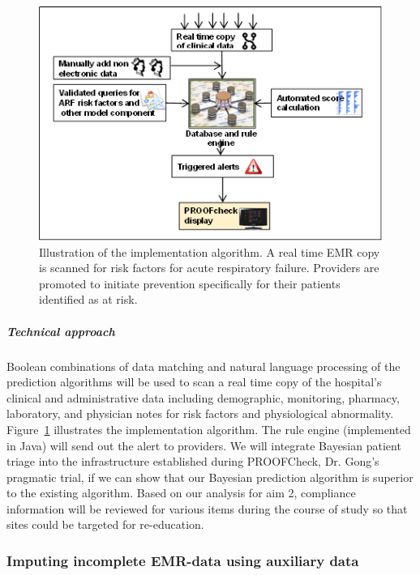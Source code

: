 \documentclass[11pt,notitlepage]{article}
\begin{document}
\begin{figure} 
 \vspace{-10pt}
 \includegraphics[scale=0.55]{Figures/Alert_trigger_fig.png} 
  \caption{\footnotesize Illustration of the implementation algorithm. A real time EMR copy is scanned for risk factors for acute respiratory failure. Providers are promoted to initiate prevention specifically for their patients identified as at risk.}
   \vspace{-20pt}
  \label{fig:implementation}
\end{figure} 

\subparagraph*{Technical approach}
Boolean combinations of data matching and natural language processing of the prediction algorithms will be used to scan a real time copy of the hospital's clinical and administrative data including demographic, monitoring, pharmacy, laboratory, and physician notes for risk factors and physiological abnormality. Figure~\ref{fig:implementation} illustrates the implementation algorithm. The rule engine (implemented in Java) will send out the alert to providers.
We will integrate Bayesian patient triage into the infrastructure established during PROOFCheck, Dr. Gong's pragmatic trial, if we can show that our Bayesian prediction algorithm is superior to the existing algorithm. Based on our analysis for aim 2, compliance information will be reviewed for various items during the course of study so that sites could be targeted for re-education.

\subsubsection*{Imputing incomplete EMR-data using auxiliary data}
\end{document}
